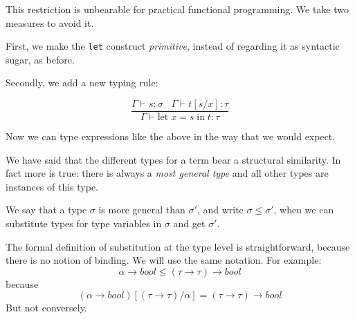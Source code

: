 \begin{slide*}


\vspace*{0.5cm}

This restriction is unbearable for practical functional programming. We take
two measures to avoid it.

First, we make the {\tt let} construct {\em primitive}, instead of regarding it
as syntactic sugar, as before.

Secondly, we add a new typing rule:

{\red $$ \frac{\Gamma \vdash s : \sigma \;\;\; \Gamma \vdash t[s/x] : \tau}
        {\Gamma \vdash \mbox{let}\; x = s\; \mbox{in}\; t : \tau} $$}

Now we can type expressions like the above in the way that we would expect.

\end{slide*}



\begin{slide*}


\vspace*{0.5cm}

We have said that the different types for a term bear a structural similarity.
In fact more is true: there is always a {\em most general type} and all other
types are instances of this type.

We say that a type {\red $\sigma$} is more general than {\red $\sigma'$}, and
write {\red $\sigma \leq \sigma'$}, when we can substitute types for type
variables in {\red $\sigma$} and get {\red $\sigma'$}.

The formal definition of substitution at the type level is straightforward,
because there is no notion of binding. We will use the same notation. For
example:
{\red $$ \alpha \to bool \leq (\tau \to \tau) \to bool $$}
because
{\red $$ (\alpha \to bool)[(\tau \to \tau)/\alpha] = (\tau \to \tau)
\to bool $$}
But not conversely.


\end{slide*}


